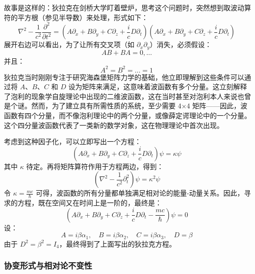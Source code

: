 故事是这样的：狄拉克在剑桥大学盯着壁炉，思考这个问题时，突然想到取波动算符的平方根（参见半导数）来处理，形式如下：
\[
\nabla^2 - \frac{1}{c^2} \frac{\partial^2}{\partial t^2} = \left(A \partial_x + B \partial_y + C \partial_z + \frac{i}{c} D \partial_t \right) \left(A \partial_x + B \partial_y + C \partial_z + \frac{i}{c} D \partial_t \right)~
\]
展开右边可以看出，为了让所有交叉项（如 \(\partial_x \partial_y\)）消失，必须假设：
\[
AB + BA = 0, \ldots~
\]
并且：
\[
A^2 = B^2 = \dots = 1~
\]
狄拉克当时刚刚专注于研究海森堡矩阵力学的基础，他立即理解到这些条件可以通过将 \(A\)、\(B\)、\(C\) 和 \(D\) 设为矩阵来满足，这意味着波函数有多个分量。这立刻解释了泡利的现象学自旋理论中出现的二维波函数，这在当时甚至对泡利本人来说也曾是个谜。然而，为了建立具有所需性质的系统，至少需要 4×4 矩阵——因此，波函数有四个分量，而不像泡利理论中的两个分量，或像薛定谔理论中的一个分量。这个四分量波函数代表了一类新的数学对象，这在物理理论中首次出现。

考虑到这种因子化，可以立即写出一个方程：
\[
\left(A \partial_x + B \partial_y + C \partial_z + \frac{i}{c} D \partial_t \right) \psi = \kappa \psi~
\]
其中 \(\kappa\) 待定。再将矩阵算符作用于方程两边，得到：
\[
\left( \nabla^2 - \frac{1}{c^2} \partial_t^2 \right) \psi = \kappa^2 \psi~
\]
令 \(\kappa = \frac{mc}{\hbar}\) 可得，波函数的所有分量都单独满足相对论的能量-动量关系。因此，寻求的方程，既在空间又在时间上是一阶的，最终是：
\[
\left( A \partial_x + B \partial_y + C \partial_z + \frac{i}{c} D \partial_t - \frac{mc}{\hbar} \right) \psi = 0~
\]
设：
\[
A = i \beta \alpha_1, \quad B = i \beta \alpha_2, \quad C = i \beta \alpha_3, \quad D = \beta~
\]
由于 \(D^2 = \beta^2 = I_4\)，最终得到了上面写出的狄拉克方程。
\subsubsection{协变形式与相对论不变性}

